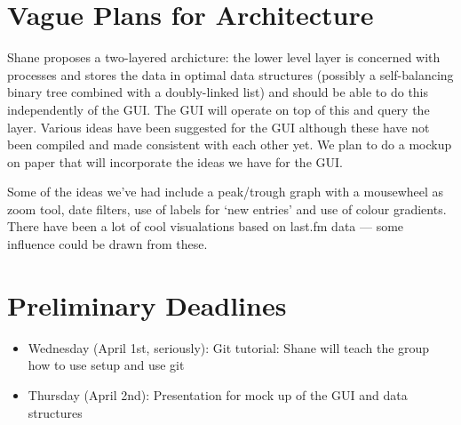 \documentclass[titlepage,a4paper]{article}
\begin{document}
\section{Vague Plans for Architecture}
Shane proposes a two-layered archicture: the lower level layer is concerned with
processes and stores the data in optimal data structures (possibly a
self-balancing binary tree combined with a doubly-linked list) and should be able
to do this independently of the GUI. The GUI will operate on top of this and query
the layer. Various ideas have been suggested for the GUI although these have not
been compiled and made consistent with each other yet.
We plan to do a mockup on paper that will incorporate the ideas we have for the GUI.
\par Some of the ideas we've had include a peak/trough graph with a mousewheel as 
zoom tool, date filters, use of labels for `new entries' and use of colour gradients.
There have been a lot of cool visualations based on last.fm data --- some influence
could be drawn from these.

\section{Preliminary Deadlines}
\begin{itemize}
\item Wednesday (April 1st, seriously): Git tutorial: Shane will teach the group how to use setup and use git
\item Thursday (April 2nd): Presentation for mock up of the GUI and data structures
\end{itemize}
\end{document}
